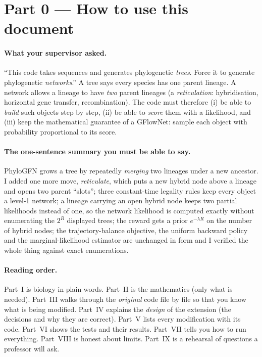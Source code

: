 \section*{Part 0 --- How to use this document}

\paragraph{What your supervisor asked.} ``This code takes sequences and generates phylogenetic \emph{trees}. Force it to generate phylogenetic \emph{networks}.'' A tree says every species has one parent lineage. A network allows a lineage to have \emph{two} parent lineages (a \emph{reticulation}: hybridisation, horizontal gene transfer, recombination). The code must therefore (i) be able to \emph{build} such objects step by step, (ii) be able to \emph{score} them with a likelihood, and (iii) keep the mathematical guarantee of a GFlowNet: sample each object with probability proportional to its score.

\paragraph{The one-sentence summary you must be able to say.}\leavevmode

\begin{saybox}
PhyloGFN grows a tree by repeatedly \emph{merging} two lineages under a new ancestor. I added one more move, \emph{reticulate}, which puts a new hybrid node above a lineage and opens two parent ``slots''; three constant-time legality rules keep every object a level-1 network; a lineage carrying an open hybrid node keeps two partial likelihoods instead of one, so the network likelihood is computed exactly without enumerating the $2^R$ displayed trees; the reward gets a prior $e^{-\lambda R}$ on the number of hybrid nodes; the trajectory-balance objective, the uniform backward policy and the marginal-likelihood estimator are unchanged in form and I verified the whole thing against exact enumerations.
\end{saybox}

\paragraph{Reading order.} Part~I is biology in plain words. Part~II is the mathematics (only what is needed). Part~III walks through the \emph{original} code file by file so that you know what is being modified. Part~IV explains the \emph{design} of the extension (the decisions and why they are correct). Part~V lists every modification with its code. Part~VI shows the tests and their results. Part~VII tells you how to run everything. Part~VIII is honest about limits. Part~IX is a rehearsal of questions a professor will ask.


